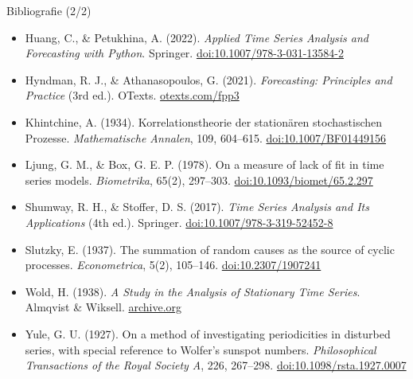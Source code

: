 \begin{frame}{Bibliografie (2/2)}
\itemsize{\scriptsize}
\begin{itemize}
    \item Huang, C., \& Petukhina, A. (2022). \textit{Applied Time Series Analysis and Forecasting with Python}. Springer. \href{https://doi.org/10.1007/978-3-031-13584-2}{doi:10.1007/978-3-031-13584-2}
    \item Hyndman, R. J., \& Athanasopoulos, G. (2021). \textit{Forecasting: Principles and Practice} (3rd ed.). OTexts. \href{https://otexts.com/fpp3/}{otexts.com/fpp3}
    \item Khintchine, A. (1934). Korrelationstheorie der stationären stochastischen Prozesse. \textit{Mathematische Annalen}, 109, 604--615. \href{https://doi.org/10.1007/BF01449156}{doi:10.1007/BF01449156}
    \item Ljung, G. M., \& Box, G. E. P. (1978). On a measure of lack of fit in time series models. \textit{Biometrika}, 65(2), 297--303. \href{https://doi.org/10.1093/biomet/65.2.297}{doi:10.1093/biomet/65.2.297}
    \item Shumway, R. H., \& Stoffer, D. S. (2017). \textit{Time Series Analysis and Its Applications} (4th ed.). Springer. \href{https://doi.org/10.1007/978-3-319-52452-8}{doi:10.1007/978-3-319-52452-8}
    \item Slutzky, E. (1937). The summation of random causes as the source of cyclic processes. \textit{Econometrica}, 5(2), 105--146. \href{https://doi.org/10.2307/1907241}{doi:10.2307/1907241}
    \item Wold, H. (1938). \textit{A Study in the Analysis of Stationary Time Series}. Almqvist \& Wiksell. \href{https://archive.org/details/in.ernet.dli.2015.262214}{archive.org}
    \item Yule, G. U. (1927). On a method of investigating periodicities in disturbed series, with special reference to Wolfer's sunspot numbers. \textit{Philosophical Transactions of the Royal Society A}, 226, 267--298. \href{https://doi.org/10.1098/rsta.1927.0007}{doi:10.1098/rsta.1927.0007}
\end{itemize}
\end{frame}


